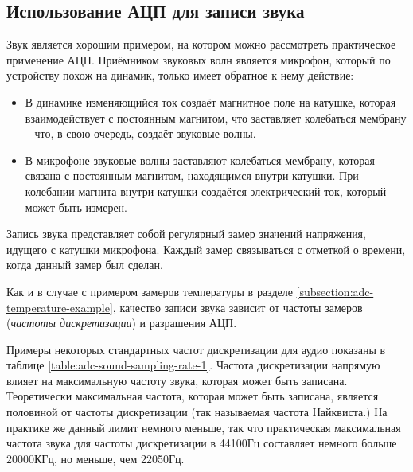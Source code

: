 \documentclass[../sparc.tex]{subfiles}
\begin{document}
\subsection{Использование АЦП для записи звука}

Звук является хорошим примером, на котором можно рассмотреть практическое
применение АЦП.  Приёмником звуковых волн является микрофон, который по
устройству похож на динамик, только имеет обратное к нему действие:

\begin{itemize}
\item В динамике изменяющийся ток создаёт магнитное поле на катушке, которая
  взаимодействует с постоянным магнитом, что заставляет колебаться мембрану --
  что, в свою очередь, создаёт звуковые волны.
\item В микрофоне звуковые волны заставляют колебаться мембрану, которая связана
  с постоянным магнитом, находящимся внутри катушки.  При колебании магнита
  внутри катушки создаётся электрический ток, который может быть измерен.
\end{itemize}

Запись звука представляет собой регулярный замер значений напряжения, идущего с
катушки микрофона.  Каждый замер связываться с отметкой о времени, когда данный
замер был сделан.

Как и в случае с примером замеров температуры в разделе
\ref{subsection:adc-temperature-example}, качество записи звука зависит от
частоты замеров (\emph{частоты дискретизации}) и разрашения АЦП.

Примеры некоторых стандартных частот дискретизации для аудио показаны в таблице
\ref{table:adc-sound-sampling-rate-1}.  Частота дискретизации напрямую влияет на
максимальную частоту звука, которая может быть записана.  Теоретически
максимальная частота, которая может быть записана, является половиной от частоты
дискретизации (так называемая частота Найквиста.)  На практике же данный лимит
немного меньше, так что практическая максимальная частота звука для частоты
дискретизации в 44100Гц составляет немного больше 20000КГц, но меньше, чем
22050Гц. \cite{audacityteam:sample-rates}

\end{document}
